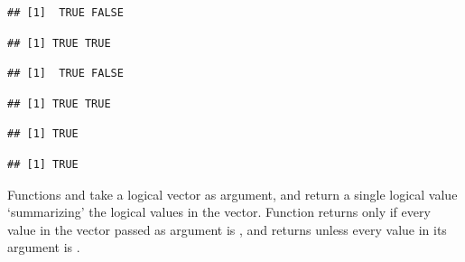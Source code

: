 \documentclass[krantz2]{krantz}\usepackage{knitr}%
\begin{document}
\begin{knitrout}\footnotesize
{}\color{fgcolor}\begin{kframe}
\begin{alltt}
 \hlkwb{<-} \hlstd{(}\hlstd{,}\hlstd{)}
 \hlkwb{<-} \hlstd{(}\hlstd{,}\hlstd{)}
\end{alltt}
\begin{verbatim}
## [1]  TRUE FALSE
\end{verbatim}
\begin{alltt}
\end{alltt}
\begin{verbatim}
## [1] TRUE TRUE
\end{verbatim}
\begin{alltt}
 \hlopt{&}  
\end{alltt}
\begin{verbatim}
## [1]  TRUE FALSE
\end{verbatim}
\begin{alltt}
 \hlopt{|}  
\end{alltt}
\begin{verbatim}
## [1] TRUE TRUE
\end{verbatim}
\begin{alltt}
 \hlopt{&&}  
\end{alltt}
\begin{verbatim}
## [1] TRUE
\end{verbatim}
\begin{alltt}
 \hlopt{||}  
\end{alltt}
\begin{verbatim}
## [1] TRUE
\end{verbatim}
\end{kframe}
\end{knitrout}

Functions  and  take a logical vector as argument, and return a single logical value `summarizing' the logical values in the vector. Function  returns  only if every value in the vector passed as argument is , and  returns  unless every value in its argument is .
\end{document}
